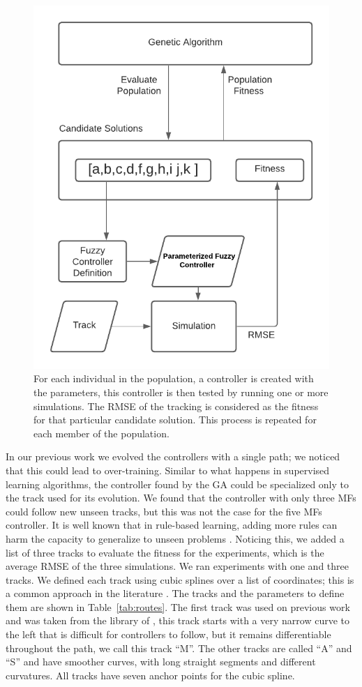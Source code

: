 \documentclass[symmetry,article,submit,moreauthors,pdftex]{Definitions/mdpi}
\begin{document}
\begin{figure}[H]
\centering
\includegraphics[width=9 cm]{img/ga}
\caption{
For each individual in the population, a controller is created with the
parameters, this controller is then tested by running one or more simulations.
The RMSE of the tracking is considered as the fitness for that particular
candidate solution. This process is repeated for each member of the
population.
}\label{fig:ga}
\end{figure} 


In our previous work \cite{Mancilla2021} we evolved the controllers with a
single path; we noticed that this could lead to over-training. Similar to what
happens in supervised learning algorithms, the controller found by the GA could
be specialized only to the track used for its evolution. We found that the
controller with only three MFs could follow new unseen tracks, but this was not
the case for the five MFs controller. It is well known that in rule-based
learning, adding more rules can harm the capacity to generalize to unseen
problems \cite{tan2016introduction}. Noticing this, we added a list of three
tracks to evaluate the fitness for the experiments, which is the average RMSE
of the three simulations. We ran experiments with one and three tracks. We
defined each track using cubic splines over a list of coordinates; this is a
common approach in the literature \cite{zhang2013cubic}. The tracks and the
parameters to define them are shown in Table~\ref{tab:routes}. The first track
was used on previous work and was taken from the library of
\cite{sakai_pythonrobotics_2018}, this track starts with a very narrow curve to
the left that is difficult for controllers to follow, but it remains
differentiable throughout the path, we call this track ``M''. The other tracks
are called ``A'' and ``S'' and have smoother curves, with long straight
segments and different curvatures. All tracks have seven anchor points for the
cubic spline.
\end{document}
